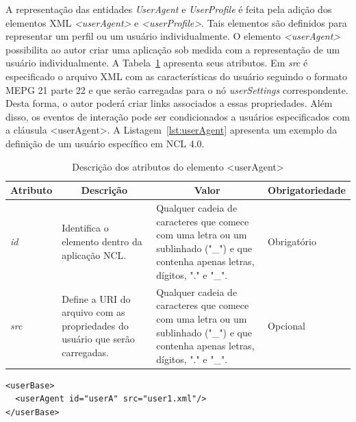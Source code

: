A representação das entidades \textit{UserAgent} e \textit{UserProfile} é feita pela adição dos elementos XML  \textit{<userAgent>} e \textit{<userProfile>}. Tais elementos são definidos para representar um perfil ou um usuário individualmente. O elemento \textit{<userAgent>} possibilita ao autor criar uma aplicação sob medida com a representação de um usuário individualmente. A Tabela~\ref{tab:atUserAgent} apresenta seus atributos. Em \textit{src} é especificado o arquivo XML com as características do usuário seguindo o formato MEPG 21 parte 22 \cite{ISO/IEC:2019aa} e que serão carregadas para o nó \textit{userSettings} correspondente. Desta forma, o autor poderá criar links associados a essas propriedades. Além disso, os eventos de interação pode ser condicionados a usuários especificados com a cláusula <userAgent>.  A Listagem~\ref{lst:userAgent} apresenta um exemplo da definição de um usuário específico em NCL 4.0.

\begin{table}[h]
\caption{Descrição dos atributos do elemento <userAgent>}
\label{tab:atUserAgent}
\centering
{
  \renewcommand\arraystretch{1.25}
  \begin{tabular}{|p{}|p{}|p{5cm}|p{3cm}|} \hline
   \multicolumn{1}{|c|}{Atributo} & \multicolumn{1}{|c|}{Descrição} & \multicolumn{1}{c|}{Valor} & \multicolumn{1}{c|}{Obrigatoriedade} \\ \hline 
    \textit{id} & Identifica o elemento dentro da aplicação NCL. & Qualquer cadeia de caracteres que comece com uma letra ou um sublinhado ("\_") e que contenha apenas letras, dígitos, "." e "\_". & Obrigatório \\  \hline
    \textit{src} & Define a URI do arquivo com as propriedades do usuário que serão carregadas. & Qualquer cadeia de caracteres que comece com uma letra ou um sublinhado ("\_") e que contenha apenas letras, dígitos, "." e "\_". & Opcional \\  \hline
  \end{tabular}
}
\end{table}

\begin{lstlisting}[language=ncl,label=lst:userAgent, caption={Definição de características de mais de um usuário de perfil diferente participante da aplicação}]
<userBase>
  <userAgent id="userA" src="user1.xml"/>
</userBase>
\end{lstlisting}

